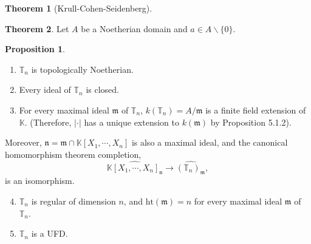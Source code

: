 \documentclass[10pt]{article}
\numberwithin{equation}{section}
\theoremstyle{definition}
\newtheorem{theorem}{Theorem} [subsection]
\newtheorem{proposition}{Proposition}[subsection]
\newcommand{\m}[0]{\mathfrak{m}}
\newcommand{\T}[0]{\mathbb{T}}
\newcommand{\K}[0]{\mathbb{K}}
\newcommand{\ab}[1]{\vert #1 \vert}
\begin{document}
\begin{theorem}[Krull-Cohen-Seidenberg]
  
\end{theorem}

\begin{theorem}
    Let $A$ be a Noetherian domain and $a\in A\backslash\{0\}$. 
\end{theorem}

\begin{proposition}$\:$
  \label{proposition_30_1}
  \begin{enumerate}[1. ]
    \item $\T_n$ is topologically Noetherian.
    \item Every ideal of $\T_n$ is closed.
    \item For every maximal ideal $\m$ of $\T_n$, $k(\T_n)=A/\m$ is a finite field extension of $\K$. (Therefore, $\ab{\cdot}$ has a unique extension to $k(\m)$ by Proposition 5.1.2).
  \end{enumerate}
  Moreover, $\mathfrak{n} = \m\cap\K[X_1,\cdots,X_n]$ is also a maximal ideal, and the canonical homomorphism theorem completion,
  \begin{equation*}
    \widehat{\K[X_1,\cdots,X_n]_\mathfrak{n}}\to \widehat{(\T_n)_{\m}},
  \end{equation*}
  is an isomorphism.
  \begin{enumerate}
    \setcounter{enumi}{3}
    \item $\T_n$ is regular of dimension $n$, and $\mathrm{ht}(\m)=n$ for every maximal ideal $\m$ of $\T_n$.
    \item $\T_n$ is a UFD.
  \end{enumerate}
\end{proposition}
\end{document}
